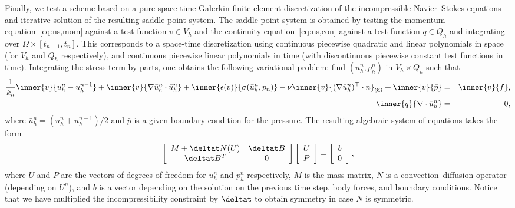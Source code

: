Finally, we test a scheme based on a pure space-time Galerkin finite
element discretization of the incompressible Navier--Stokes equations
and iterative solution of the resulting saddle-point system. The
saddle-point system is obtained by testing the momentum
equation~\eqref{eq:ns,mom} against a test function $v \in V_h$ and the
continuity equation~\eqref{eq:ns,con} against a test function $q \in
Q_h$ and integrating over $\Omega \times [t_{n-1}, t_n]$. This
corresponds to a space-time discretization using continuous piecewise
quadratic and linear polynomials in space (for $V_h$ and $Q_h$
respectively), and continuous piecewise linear polynomials in time
(with discontinuous piecewise constant test functions in
time). Integrating the stress term by parts, one obtains the following
variational problem: find $(u^n_h, p^n_h)$ in $V_h \times Q_h$ such
that
\begin{eqnarray*}
    \frac{1}{k_n} \inner{v}{u^n_h - u^{n-1}_h}
    + \inner{v}{\nabla \bar{u}^n_h \cdot \bar{u}^n_h}
    + \inner{\epsilon(v)}{\sigma(\bar{u}^n_h, p_n)}
    - \nu \inner{v}{(\nabla \bar{u}^n_h)^{\top} \cdot n}_{\partial \Omega}
    + \inner{v}{\bar{p}} &=& \inner{v}{f}, \\
    \inner{q}{\nabla \cdot \bar{u}^n_h} &=& 0,
\end{eqnarray*}
where $\bar{u}^n_h = ({u}^n_h + {u}^{n-1}_h) / 2$ and $\bar{p}$ is a
given boundary condition for the pressure. The resulting algebraic
system of equations takes the form
\begin{eqnarray}
\left[
\begin{array}{cc}
M + \deltat N(U) & \deltat B \\
\deltat B^T & 0
\end{array}
\right]
\left[
\begin{array}{c}
U \\ P
\end{array}
\right]
=
\left[
\begin{array}{c}
b\\ 0
\end{array}
\right],
\label{timestepping}
\end{eqnarray}
where $U$ and $P$ are the vectors of degrees of freedom for $u^n_h$
and $p^n_h$ respectively, $M$ is the mass matrix, $N$ is a
convection--diffusion operator (depending on $U^n$), and $b$ is a
vector depending on the solution on the previous time step, body
forces, and boundary conditions. Notice that we have multiplied the
incompressibility constraint by $\deltat$ to obtain symmetry in case $N$
is symmetric.

